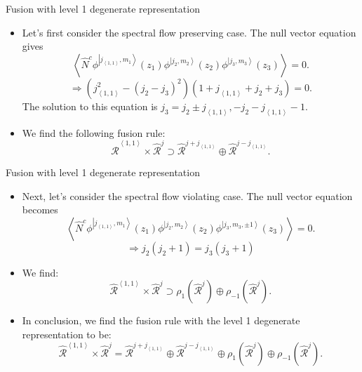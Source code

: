 \documentclass{beamer}
\newcommand{\ket}[1]{\left| #1 \right\rangle}
\newcommand{\vev}[1]{\left\langle #1 \right\rangle}
\begin{document}
\begin{frame}{Fusion with level 1 degenerate representation}
  \begin{itemize}
    \item Let's first consider the spectral flow preserving case. The null vector equation gives
      \begin{equation*}
        \vev{\hat{N}^{c} \phi^{\ket{j_{\vev{1,1}},m_{1}}} (z_{1}) \phi^{\ket{j_{2},m_{2}}} (z_{2}) \phi^{\ket{j_{3},m_{3}}} (z_{3})} = 0. 
      \end{equation*}
      \begin{equation*}
        \Longrightarrow \left( j_{\vev{1,1}}^{2} - (j_{2}-j_{3})^{2} \right)(1+j_{\vev{1,1}}+j_{2}+j_{3}) = 0.
      \end{equation*}
      The solution to this equation is $j_{3} = j_{2} \pm j_{\vev{1,1}}, -j_{2} - j_{\vev{1,1}} - 1$. 
    \item We find the following fusion rule: 
      \begin{equation*}
        \widehat{\mathcal{R}}^{\vev{1,1}} \times \widehat{\mathcal{R}}^{j} \supset \widehat{\mathcal{R}}^{j+j_{\vev{1,1}}} \oplus \widehat{\mathcal{R}}^{j-j_{\vev{1,1}}}.
      \end{equation*}
  \end{itemize}
\end{frame}

\begin{frame}{Fusion with level 1 degenerate representation}
  \begin{itemize}
    \item Next, let's consider the spectral flow violating case. The null vector equation becomes
      \begin{equation*}
          \vev{\hat{N}^{c} \phi^{\ket{j_{\vev{1,1}},m_{1}}} (z_{1}) \phi^{\ket{j_{2},m_{2}}} (z_{2}) \phi^{\ket{j_{3},m_{3}, \pm 1}} (z_{3})} = 0.
      \end{equation*}
      \begin{equation*}
        \Longrightarrow j_{2}(j_{2}+1) = j_{3} (j_{3}+1)
      \end{equation*}
    \item We find: 
      \begin{equation*}
        \widehat{\mathcal{R}}^{\vev{1,1}} \times \widehat{\mathcal{R}}^{j} \supset \rho_{ 1} \left(\widehat{\mathcal{R}}^{j}\right) \oplus \rho_{- 1} \left(\widehat{\mathcal{R}}^{j}\right).
      \end{equation*}
    \item In conclusion, we find the fusion rule with the level 1 degenerate representation to be:
      \begin{equation*}
        \widehat{\mathcal{R}}^{\vev{1,1}} \times \widehat{\mathcal{R}}^{j} = \widehat{\mathcal{R}}^{j+j_{\vev{1,1}}} \oplus \widehat{\mathcal{R}}^{j-j_{\vev{1,1}}}
    \oplus \rho_{1} \left( \widehat{\mathcal{R}}^{j} \right) \oplus \rho_{-1} \left( \widehat{\mathcal{R}}^{j} \right). \label{mainresult}
      \end{equation*}
  \end{itemize}
\end{frame}
\end{document}
